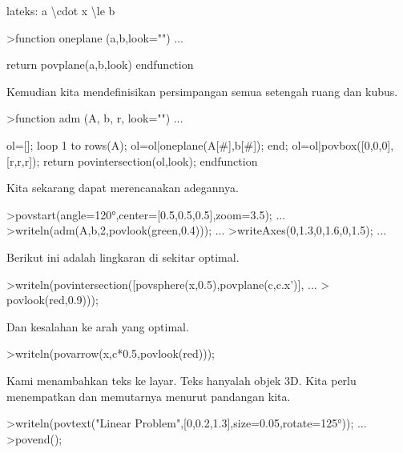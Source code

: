 \documentclass[a4paper,10pt]{article}
\begin{document}
\begin{eulernotebook}
\begin{eulercomment}
\begin{eulercomment}
\begin{eulercomment}
lateks: a \textbackslash{}cdot x \textbackslash{}le b
\end{eulercomment}
\begin{eulerprompt}
>function oneplane (a,b,look="") ...
\end{eulerprompt}
\begin{eulerudf}
    return povplane(a,b,look)
  endfunction
\end{eulerudf}
\begin{eulercomment}
Kemudian kita mendefinisikan persimpangan semua setengah ruang dan
kubus.
\end{eulercomment}
\begin{eulerprompt}
>function adm (A, b, r, look="") ...
\end{eulerprompt}
\begin{eulerudf}
    ol=[];
    loop 1 to rows(A); ol=ol|oneplane(A[#],b[#]); end;
    ol=ol|povbox([0,0,0],[r,r,r]);
    return povintersection(ol,look);
  endfunction
\end{eulerudf}
\begin{eulercomment}
Kita sekarang dapat merencanakan adegannya.
\end{eulercomment}
\begin{eulerprompt}
>povstart(angle=120°,center=[0.5,0.5,0.5],zoom=3.5); ...
>writeln(adm(A,b,2,povlook(green,0.4))); ...
>writeAxes(0,1.3,0,1.6,0,1.5); ...
\end{eulerprompt}
\begin{eulercomment}
Berikut ini adalah lingkaran di sekitar optimal.
\end{eulercomment}
\begin{eulerprompt}
>writeln(povintersection([povsphere(x,0.5),povplane(c,c.x')], ...
>  povlook(red,0.9)));
\end{eulerprompt}
\begin{eulercomment}
Dan kesalahan ke arah yang optimal.
\end{eulercomment}
\begin{eulerprompt}
>writeln(povarrow(x,c*0.5,povlook(red)));
\end{eulerprompt}
\begin{eulercomment}
Kami menambahkan teks ke layar. Teks hanyalah objek 3D. Kita perlu
menempatkan dan memutarnya menurut pandangan kita.
\end{eulercomment}
\begin{eulerprompt}
>writeln(povtext("Linear Problem",[0,0.2,1.3],size=0.05,rotate=125°)); ...
>povend();
\end{eulerprompt}

\end{eulercomment}
\end{eulercomment}
\end{eulernotebook}
\end{document}
